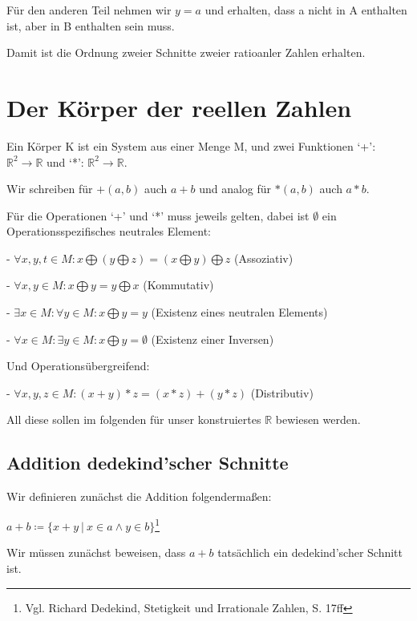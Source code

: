 \documentclass[12pt]{article}
\begin{document}
    Für den anderen Teil nehmen wir $y = a$ und erhalten, dass a nicht in A enthalten ist, aber in B enthalten sein
    muss.

    Damit ist die Ordnung zweier Schnitte zweier ratioanler Zahlen erhalten.

    \newpage

    \section{Der Körper der reellen Zahlen}

    Ein Körper K ist ein System aus einer Menge M, und zwei Funktionen `+': $\mathbb{R}^2 \rightarrow \mathbb{R}$
    und `*': $\mathbb{R}^2 \rightarrow \mathbb{R}$.

    Wir schreiben für $+(a, b)$ auch $a + b$ und analog für $*(a, b)$ auch $a * b$.

    Für die Operationen `+' und `*' muss jeweils gelten, dabei ist $\emptyset$ ein Operationsspezifisches
    neutrales Element:

    - $\forall x, y, t \in M: x \bigoplus (y \bigoplus z) = (x \bigoplus y) \bigoplus z$  (Assoziativ)

    - $\forall x, y \in M: x \bigoplus y = y \bigoplus x$  (Kommutativ)

    - $\exists x \in M: \forall y \in M: x \bigoplus y = y$  (Existenz eines neutralen Elements)

    - $\forall x \in M: \exists y \in M: x \bigoplus y = \emptyset$  (Existenz einer Inversen)

    Und Operationsübergreifend:

    - $\forall x, y, z \in M: (x + y) * z = (x * z) + (y * z)$ (Distributiv)

    All diese sollen im folgenden für unser konstruiertes $\mathbb{R}$ bewiesen werden.

    \subsection{Addition dedekind'scher Schnitte}

    Wir definieren zunächst die Addition folgendermaßen:

    $a + b \coloneqq \{x + y \mspace{4mu} | \mspace{4mu} x \in a \land y \in b\}$\footnote{
        Vgl. Richard Dedekind, Stetigkeit und Irrationale Zahlen, S. 17ff
    }

    Wir müssen zunächst beweisen, dass $a + b$ tatsächlich ein dedekind'scher Schnitt ist.
\end{document}
